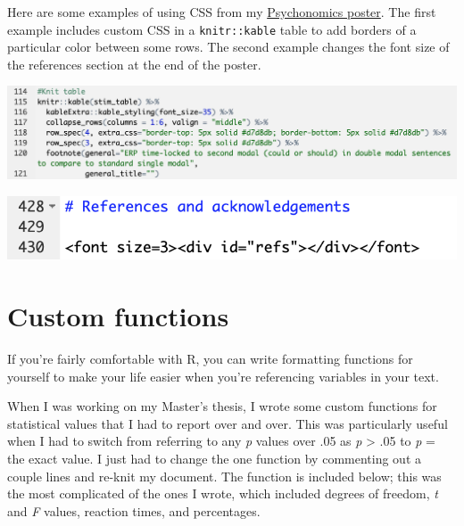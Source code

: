 \documentclass[
]{book}
\begin{document}
Here are some examples of using CSS from my \href{https://github.com/hollzzar/psychonomics-poster/blob/master/Psychonomics.Rmd}{Psychonomics poster}. The first example includes custom CSS in a \texttt{knitr::kable} table to add borders of a particular color between some rows. The second example changes the font size of the references section at the end of the poster.

\includegraphics[width=20.67in]{images/css_example}

\includegraphics[width=10.39in]{images/html_example}

\hypertarget{help}{%
\section{Custom functions}\label{help}}

If you're fairly comfortable with R, you can write formatting functions for yourself to make your life easier when you're referencing variables in your text.

When I was working on my Master's thesis, I wrote some custom functions for statistical values that I had to report over and over. This was particularly useful when I had to switch from referring to any \emph{p} values over .05 as \emph{p} \textgreater{} .05 to \emph{p} = the exact value. I just had to change the one function by commenting out a couple lines and re-knit my document. The function is included below; this was the most complicated of the ones I wrote, which included degrees of freedom, \emph{t} and \emph{F} values, reaction times, and percentages.
\end{document}

